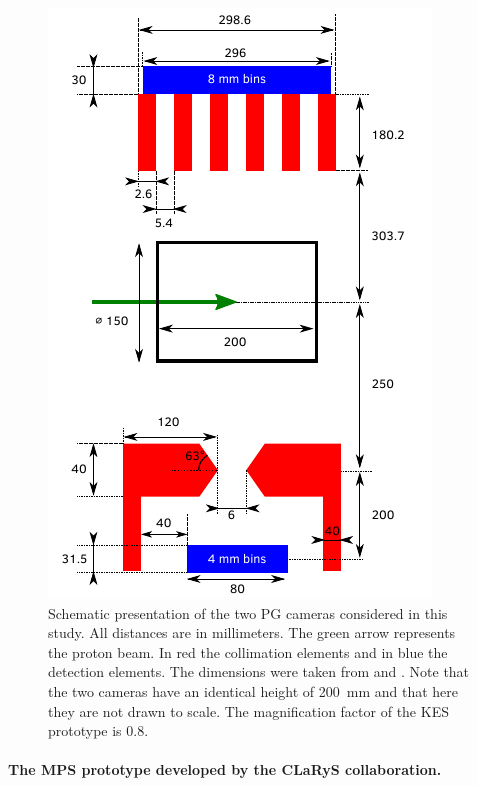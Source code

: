 \documentclass[a4paper,english,12pt]{article}
\begin{document}
\begin{figure}
  \centering
  \includegraphics[width=0.5\linewidth]{detectors_cyl2}
	\caption{Schematic presentation of the two PG cameras considered in this study. All distances are in millimeters. The green arrow represents the proton beam. In red the collimation elements and in blue the detection elements. The dimensions were taken from \cite{Pinto2014a} and \cite{Perali2014,Sterpin2015}. Note that the two cameras have an identical height of 200~mm and that here they are not drawn to scale. The magnification factor of the KES prototype is 0.8.}
  \label{fig:detectors}
\end{figure}

\paragraph{The MPS prototype developed by the CLaRyS collaboration.}
\end{document}
